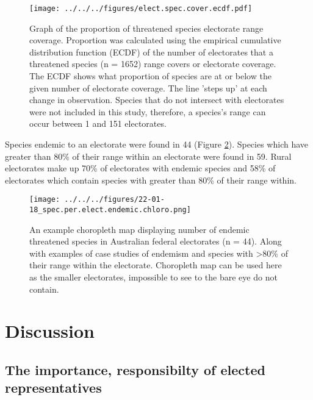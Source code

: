 \documentclass[a4paper,11pt]{article}
\begin{document}

\begin{figure}[H]
	\centering
    \texttt{[image: ../../../figures/elect.spec.cover.ecdf.pdf]}
    \caption{Graph of the proportion of threatened species electorate range coverage. Proportion was calculated using the empirical cumulative distribution function (ECDF) of the number of electorates that a threatened species (n = 1652) range covers or electorate coverage. The ECDF shows what proportion of species are at or below the given number of electorate coverage. The line 'steps up' at each change in observation. Species that do not intersect with electorates were not included in this study, therefore, a species's range can occur between 1 and 151 electorates.}
    \label{fig:hist}
\end{figure}

Species endemic to an electorate were found in 44 (Figure \ref{fig:endemic_chloro}). Species which have greater than 80\% of their range within an electorate were found in 59. Rural electorates make up 70\% of electorates with endemic species and 58\% of electorates which contain species with greater than 80\% of their range within.

\begin{figure}[H]
	\centering
    \texttt{[image: ../../../figures/22-01-18\_spec.per.elect.endemic.chloro.png]}
    \caption{An example choropleth map displaying number of endemic threatened species in Australian federal electorates (n = 44). Along with examples of case studies of endemism and species with >80\% of their range within the electorate. Choropleth map can be used here as the smaller electorates, impossible to see to the bare eye do not contain.}
    \label{fig:endemic_chloro}
\end{figure}

\section{Discussion}

\subsection{The importance, responsibilty of elected representatives}
\end{document}
